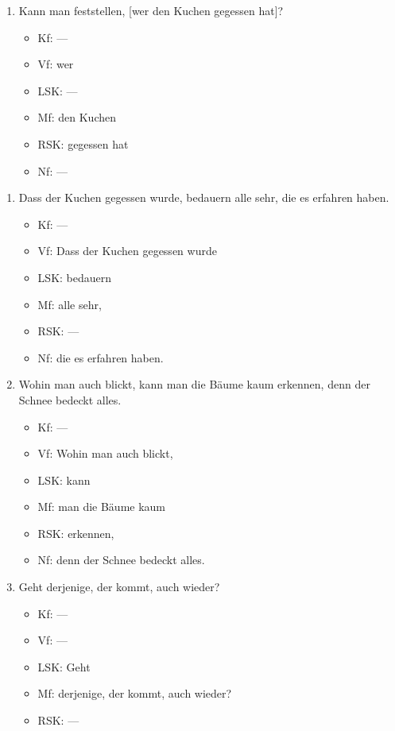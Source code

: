 \begin{enumerate}
  \item Kann man feststellen, [wer den Kuchen gegessen hat]?
    \begin{itemize}
      \item Kf: ---
      \item Vf: wer
      \item LSK: ---
      \item Mf: den Kuchen
      \item RSK: gegessen hat
      \item Nf: ---
    \end{itemize}
\end{enumerate}

\label{sol:saetze02}

\begin{enumerate}
  \item Dass der Kuchen gegessen wurde, bedauern alle sehr, die es erfahren haben.
    \begin{itemize}
      \item Kf: ---
      \item Vf: Dass der Kuchen gegessen wurde
      \item LSK: bedauern
      \item Mf: alle sehr,
      \item RSK: ---
      \item Nf: die es erfahren haben.
    \end{itemize}
  \item Wohin man auch blickt, kann man die Bäume kaum erkennen, denn der Schnee bedeckt alles.
    \begin{itemize}
      \item Kf: ---
      \item Vf: Wohin man auch blickt,
      \item LSK: kann
      \item Mf: man die Bäume kaum
      \item RSK: erkennen,
      \item Nf: denn der Schnee bedeckt alles.
    \end{itemize}
  \item Geht derjenige, der kommt, auch wieder?
    \begin{itemize}
      \item Kf: ---
      \item Vf: ---
      \item LSK: Geht
      \item Mf: derjenige, der kommt, auch wieder?
      \item RSK: ---

\end{itemize}
\end{enumerate}
